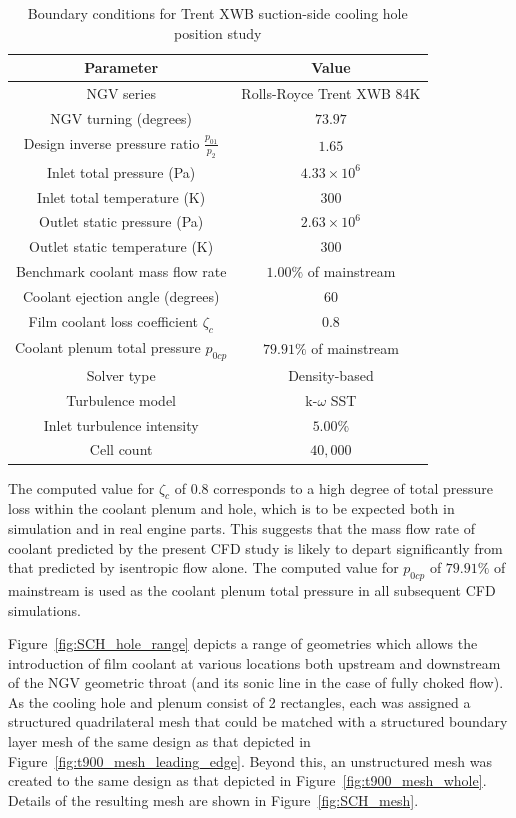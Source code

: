 \documentclass[a4paper, 11pt, oneside]{report}
\begin{document}
\begin{table}[H]
\caption{Boundary conditions for Trent XWB suction-side cooling hole position study}
\label{SCH_parameters}
\begin{center}
\begin{tabular}{|c|c|}
\hline
Parameter & Value\\
\hline
NGV series & Rolls-Royce Trent XWB 84K\\
NGV turning (degrees) & $73.97$\\
Design inverse pressure ratio $\frac{p_{01}}{p_2}$ & $1.65$\\
Inlet total pressure (Pa) & $4.33 \times 10^6$\\
Inlet total temperature (K) & $300$\\
Outlet static pressure (Pa) & $2.63 \times 10^6$\\
Outlet static temperature (K) & $300$\\
Benchmark coolant mass flow rate & $1.00\%$ of mainstream\\
Coolant ejection angle (degrees) & $60$\\
Film coolant loss coefficient $\zeta_c$ & $0.8$\\
Coolant plenum total pressure $p_{0cp}$ & $79.91\%$ of mainstream\\
Solver type & Density-based\\
Turbulence model & k-$\omega$ SST\\
Inlet turbulence intensity & $5.00\%$\\
Cell count & $40,000$\\
\hline
\end{tabular}
\end{center}
\end{table}

The computed value for $\zeta_c$ of $0.8$ corresponds to a high degree of total pressure loss within the coolant plenum and hole, which is to be expected both in simulation and in real engine parts. This suggests that the mass flow rate of coolant predicted by the present CFD study is likely to depart significantly from that predicted by isentropic flow alone. The computed value for $p_{0cp}$ of $79.91\%$ of mainstream is used as the coolant plenum total pressure in all subsequent CFD simulations.

Figure~\ref{fig:SCH_hole_range} depicts a range of geometries which allows the introduction of film coolant at various locations both upstream and downstream of the NGV geometric throat (and its sonic line in the case of fully choked flow). As the cooling hole and plenum consist of 2 rectangles, each was assigned a structured quadrilateral mesh that could be matched with a structured boundary layer mesh of the same design as that depicted in Figure~\ref{fig:t900_mesh_leading_edge}. Beyond this, an unstructured mesh was created to the same design as that depicted in Figure~\ref{fig:t900_mesh_whole}. Details of the resulting mesh are shown in Figure~\ref{fig:SCH_mesh}.
\end{document}
